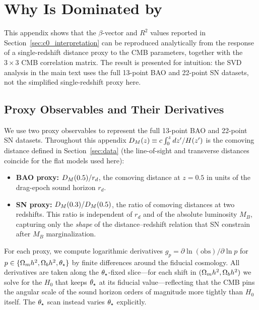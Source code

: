 
\section{Why \texorpdfstring{\czero}{c0} Is Dominated by \texorpdfstring{\omh}{omega\_m}}
\label{app:universality}

This appendix shows that the $\beta$-vector and $R^2$ values reported in Section~\ref{sec:c0_interpretation} can be reproduced analytically from the response of a single-redshift distance proxy to the CMB parameters, together with the $3 \times 3$ CMB correlation matrix. The result is presented for intuition: the SVD analysis in the main text uses the full 13-point BAO and 22-point SN datasets, not the simplified single-redshift proxy here.

\subsection{Proxy Observables and Their Derivatives}
\label{app:proxies}
We use two proxy observables to represent the full 13-point BAO and 22-point SN datasets. Throughout this appendix $D_M(z) \equiv c\int_0^z dz'/H(z')$ is the comoving distance defined in Section~\ref{sec:data} (the line-of-sight and transverse distances coincide for the flat models used here):
\begin{itemize}
\item \textbf{BAO proxy:} $D_M(0.5)/r_d$, the comoving distance at $z=0.5$ in units of the drag-epoch sound horizon $r_d$.
\item \textbf{SN proxy:} $D_M(0.3)/D_M(0.5)$, the ratio of comoving distances at two redshifts. This ratio is independent of $r_d$ and of the absolute luminosity $M_B$, capturing only the \emph{shape} of the distance--redshift relation that SN constrain after $M_B$ marginalization.
\end{itemize}

For each proxy, we compute logarithmic derivatives $g_p = \partial \ln (\text{obs}) / \partial \ln p$ for $p \in \{\Omega_m h^2, \Omega_b h^2, \theta_\star\}$ by finite differences around the fiducial cosmology. All derivatives are taken along the $\theta_\star$-fixed slice---for each shift in $(\Omega_m h^2, \Omega_b h^2)$ we solve for the $H_0$ that keeps $\theta_\star$ at its fiducial value---reflecting that the CMB pins the angular scale of the sound horizon orders of magnitude more tightly than $H_0$ itself. The $\theta_\star$ scan instead varies $\theta_\star$ explicitly.

